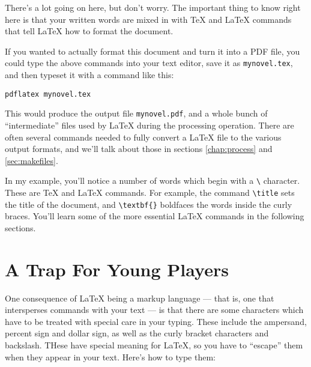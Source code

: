 There's a lot going on here, but don't worry. The important thing to know right
here is that your written words are mixed in with \TeX{} and \LaTeX{} commands
that tell \LaTeX{} how to format the document.

If you wanted to actually format this document and turn it into a PDF file,
you could type the above commands into your text editor, save it as
\texttt{mynovel.tex}, and then typeset it with a command like this:

\begin{minipage}{\textwidth}
\texttt{pdflatex mynovel.tex}
\end{minipage}

This would produce the output file \texttt{mynovel.pdf}, and a whole bunch of
``intermediate'' files used by \LaTeX{} during the processing operation. There
are often several commands needed to fully convert a \LaTeX{} file to the
various output formats, and we'll talk about those in sections
\ref{chap:process} and \ref{sec:makefiles}.

In my example, you'll notice a number of words which begin with a
\texttt{\textbackslash} character. These are \TeX{} and \LaTeX{} commands. For
example, the command \texttt{\textbackslash{}title} sets the title of the
document, and \texttt{\textbackslash{}textbf\{\}} boldfaces the words inside
the curly braces. You'll learn some of the more essential \LaTeX{} commands in
the following sections.

\section{A Trap For Young Players} \label{sec:special_chars}

One consequence of \LaTeX{} being a markup language --- that is, one that
intersperses commands with your text --- is that there are some characters
which have to be treated with special care in your typing. These include the
ampersand, percent sign and dollar sign, as well as the curly bracket
characters and backslash. THese have special meaning for \LaTeX{}, so you have
to ``escape'' them when they appear in your text. Here's how to type them:

